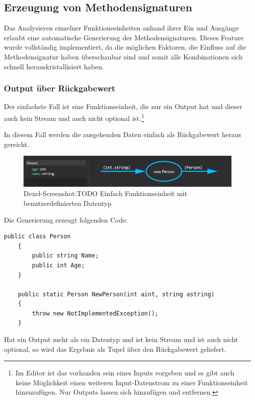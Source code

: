 \subsection{Erzeugung von Methodensignaturen}

Das Analysieren einzelner Funktionseinheiten anhand ihrer Ein und Ausgänge erlaubt eine automatische Generierung der Methodensignaturen.
Dieses Feature wurde vollständig implementiert, da die möglichen Faktoren, die Einfluss auf die Methodensignatur haben überschaubar sind und somit alle Kombinationen sich schnell herauskristallisiert haben.

\subsubsection{Output über Rückgabewert}

	Der einfachste Fall ist eine Funktionseinheit, die nur ein Output hat und
	dieser auch kein Stream und auch nicht optional ist.\footnote{Im Editor ist das vorhanden sein eines Inputs vorgeben und es gibt auch keine Möglichkeit einen weiteren Input-Datenstrom zu einer Funktionseinheit hinzuzufügen. Nur Outputs lassen sich hinzufügen und entfernen.}
	
	In diesem Fall werden die ausgehenden Daten einfach als Rückgabewert heraus gereicht.
	
	
	\begin{figure}[H]
		\centering
			\includegraphics[width=\linewidth]{./img/roslyn_simpleOutput.png} 
		\caption{Dexel-Screenshot:TODO Einfach Funktionseinheit mit benutzerdefinierten Datentyp}
	\end{figure}

	
	Die Generierung erzeugt folgenden Code:
	\begin{lstlisting}[caption=Mit Dexel generierter Code ]
	public class Person
	{
		public string Name;
		public int Age;
	}
	
	public static Person NewPerson(int aint, string astring)
	{
		throw new NotImplementedException();
	}
	\end{lstlisting}
	
	Hat ein Output mehr als ein Datentyp und ist kein Stream und ist auch nicht optional, so
	wird das Ergebnis als Tupel über den Rückgabewert geliefert.
	
